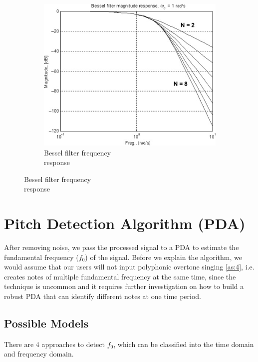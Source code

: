 \begin{figure}[h]
\begin{subfigure}{.4\textwidth}
		\includegraphics[width=1\linewidth]{Figures/bessel.jpg}
		\caption{Bessel filter frequency\\response}
		\label{fig:sub3}
	\end{subfigure}

\end{figure}

\section{Pitch Detection Algorithm (PDA)}
\label{sec:PDA}
After removing noise, we pass the processed signal to a PDA to estimate the fundamental frequency ($f_0$) of
the signal. Before we explain the algorithm, we would assume that our users will not input polyphonic overtone 
singing \cref{as:4}, i.e. creates notes of multiple fundamental frequency at the same time, since the technique is uncommon
and it requires further investigation on how to build a robust PDA that can identify different notes at one time period.

\subsection{Possible Models}
There are 4 approaches to detect $f_0$, which can be classified into the time domain and frequency domain.

